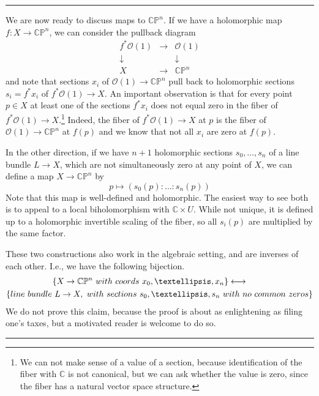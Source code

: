 \documentclass[11pt]{article}
\numberwithin{equation}{section}
\numberwithin{footnote}{section}
\newcommand{\blue}{\color{blue}}
\renewcommand{\P}{{\mathbb P}}
\newcommand{\C}{{\mathbb C}}
\begin{document}
\smallskip
{\blue \hrule}
We are now ready to discuss maps to $\C\P^n$. If we have a holomorphic map $f:X\to \C\P^n$, we can consider the pullback diagram
$$
\begin{array}{ccc}
f^*\mathcal O(1) &\longrightarrow &\mathcal O(1)\\
\downarrow&&\downarrow\\
X&\longrightarrow &\C\P^n
\end{array}
$$
and note that sections $x_i$ of $\mathcal O(1)\to \C\P^n$ pull back to holomorphic sections $s_i = f^*x_i$ of $f^*\mathcal O(1) \to X$. An important observation is that for every point $p\in X$ at least one of the sections $f^*x_i$ does not equal zero in the fiber of $f^*\mathcal O(1) \to X$.\footnote{ We can not make sense of a value of a section, because identification of the fiber with $\C$ is not canonical, but we can ask whether the value is zero, since the fiber has a natural vector space structure.} Indeed, the fiber of $f^*\mathcal O(1)\to X$  at $p$ is the fiber of $\mathcal O(1)\to\C\P^n$ at $f(p)$ and we know that not all $x_i$ are zero at $f(p)$.

In the other direction, if we have $n+1$ holomorphic sections $s_0,\ldots, s_n$ of a line bundle $L\to X$, which are not simultaneously zero at any point of $X$, we can define a map 
$X\to \C\P^n$ by 
$$
p\mapsto (s_0(p):\ldots :s_n(p)) 
$$
Note that this map is well-defined and holomorphic. The easiest way to see both is to appeal to a local biholomorphism with $\C\times U$. While not unique, it is defined up to a holomorphic invertible scaling of the fiber, so all $s_i(p)$ are multiplied by the same factor.

\smallskip
These two constructions also work in the algebraic setting, and are inverses of each other. I.e., we have the following bijection.
\begin{align*}
\{X\to \C\P^n~{\rm with~coords~}x_0,\ldots,x_n\} \longleftrightarrow \hskip 80pt\\
\{{\rm line~bundle~}L\to X,~{\rm with~sections~} s_0,\ldots,s_n{\rm ~with~no~common~zeros}\}
\end{align*}
We do not prove this claim, because the proof is about as enlightening as filing one's taxes, but a motivated reader is welcome to do so.


\smallskip
{\blue \hrule}
\end{document}
